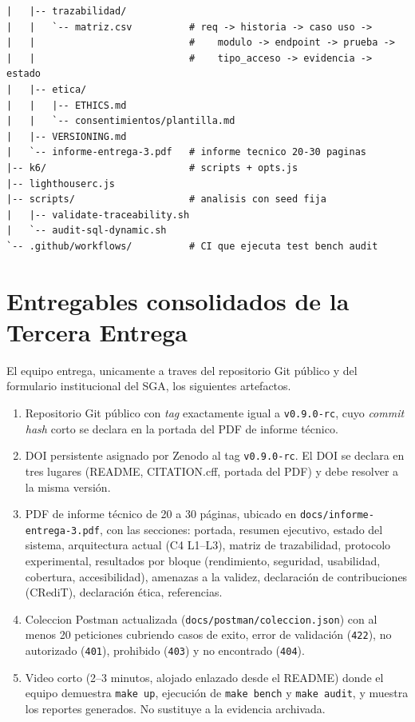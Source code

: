 \documentclass[11pt,a4paper]{article}
\begin{document}
\begin{lstlisting}[caption={Estructura minima del repositorio para la Tercera Entrega}]
|   |-- trazabilidad/
|   |   `-- matriz.csv          # req -> historia -> caso uso ->
|   |                           #    modulo -> endpoint -> prueba ->
|   |                           #    tipo_acceso -> evidencia -> estado
|   |-- etica/
|   |   |-- ETHICS.md
|   |   `-- consentimientos/plantilla.md
|   |-- VERSIONING.md
|   `-- informe-entrega-3.pdf   # informe tecnico 20-30 paginas
|-- k6/                         # scripts + opts.js
|-- lighthouserc.js
|-- scripts/                    # analisis con seed fija
|   |-- validate-traceability.sh
|   `-- audit-sql-dynamic.sh
`-- .github/workflows/          # CI que ejecuta test bench audit
\end{lstlisting}

\section{Entregables consolidados de la Tercera Entrega}

El equipo entrega, unicamente a traves del repositorio Git p\'{u}blico y del formulario institucional del SGA, los siguientes artefactos.

\begin{enumerate}
    \item Repositorio Git p\'{u}blico con \emph{tag} exactamente igual a \texttt{v0.9.0-rc}, cuyo \emph{commit hash} corto se declara en la portada del PDF de informe t\'{e}cnico.
    \item DOI persistente asignado por Zenodo al tag \texttt{v0.9.0-rc}. El DOI se declara en tres lugares (README, CITATION.cff, portada del PDF) y debe resolver a la misma versi\'{o}n.
    \item PDF de informe t\'{e}cnico de 20 a 30 p\'{a}ginas, ubicado en \texttt{docs/informe-entrega-3.pdf}, con las secciones: portada, resumen ejecutivo, estado del sistema, arquitectura actual (C4 L1--L3), matriz de trazabilidad, protocolo experimental, resultados por bloque (rendimiento, seguridad, usabilidad, cobertura, accesibilidad), amenazas a la validez, declaraci\'{o}n de contribuciones (CRediT), declaraci\'{o}n \'{e}tica, referencias.
    \item Coleccion Postman actualizada (\texttt{docs/postman/coleccion.json}) con al menos 20 peticiones cubriendo casos de exito, error de validaci\'{o}n (\texttt{422}), no autorizado (\texttt{401}), prohibido (\texttt{403}) y no encontrado (\texttt{404}).
    \item Video corto (2--3 minutos, alojado enlazado desde el README) donde el equipo demuestra \texttt{make up}, ejecuci\'{o}n de \texttt{make bench} y \texttt{make audit}, y muestra los reportes generados. No sustituye a la evidencia archivada.
\end{enumerate}
\end{document}
